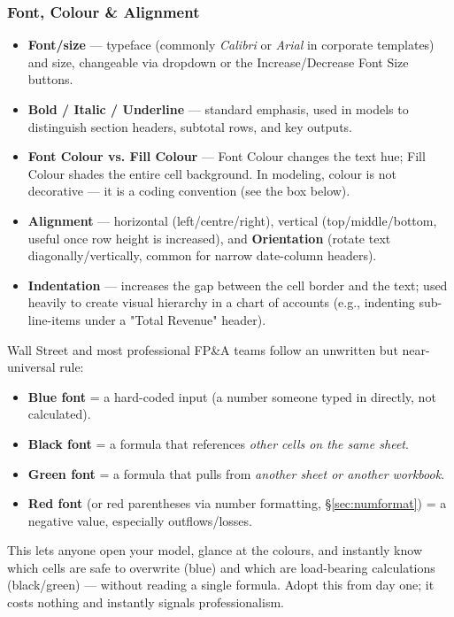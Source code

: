\documentclass[11pt,a4paper]{article}
\begin{document}
\subsubsection{Font, Colour \& Alignment}

\begin{itemize}
  \item \textbf{Font/size} --- typeface (commonly \textit{Calibri} or \textit{Arial} in corporate templates) and size, changeable via dropdown or the Increase/Decrease Font Size buttons.
  \item \textbf{Bold / Italic / Underline} --- standard emphasis, used in models to distinguish section headers, subtotal rows, and key outputs.
  \item \textbf{Font Colour vs. Fill Colour} --- Font Colour changes the text hue; Fill Colour shades the entire cell background. In modeling, colour is not decorative --- it is a coding convention (see the box below).
  \item \textbf{Alignment} --- horizontal (left/centre/right), vertical (top/middle/bottom, useful once row height is increased), and \textbf{Orientation} (rotate text diagonally/vertically, common for narrow date-column headers).
  \item \textbf{Indentation} --- increases the gap between the cell border and the text; used heavily to create visual hierarchy in a chart of accounts (e.g., indenting sub-line-items under a "Total Revenue" header).
\end{itemize}

\begin{protip}
Wall Street and most professional FP\&A teams follow an unwritten but near-universal rule:
\begin{itemize}
  \item \textbf{Blue font} = a hard-coded input (a number someone typed in directly, not calculated).
  \item \textbf{Black font} = a formula that references \emph{other cells on the same sheet}.
  \item \textbf{Green font} = a formula that pulls from \emph{another sheet or another workbook}.
  \item \textbf{Red font} (or red parentheses via number formatting, \S\ref{sec:numformat}) = a negative value, especially outflows/losses.
\end{itemize}
This lets anyone open your model, glance at the colours, and instantly know which cells are safe to overwrite (blue) and which are load-bearing calculations (black/green) --- without reading a single formula. Adopt this from day one; it costs nothing and instantly signals professionalism.
\end{protip}
\end{document}
